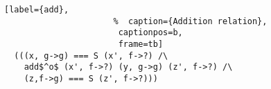 \begin{figure}[!t]
  \centering
  \begin{minipage}{\columnwidth}
    \begin{lstlisting}[label={add},
                      %  caption={Addition relation},
                       captionpos=b,
                       frame=tb]
  (((x, g->g) === S (x', f->?) /\
    add$^o$ (x', f->?) (y, g->g) (z', f->?) /\
    (z,f->g) === S (z', f->?)))
    \end{lstlisting}
  \end{minipage}
\end{figure}